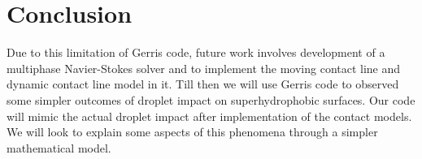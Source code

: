 \section{Conclusion}
Due to this limitation of Gerris code, future work involves development of a multiphase Navier-Stokes solver and to implement the moving contact line and dynamic contact line 
model in it. Till then we will use Gerris code to observed some simpler outcomes of droplet impact on superhydrophobic surfaces.
Our code will mimic the actual droplet impact after implementation of the contact models. We will
look to explain some aspects of this phenomena through a simpler mathematical model.


